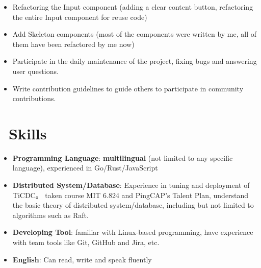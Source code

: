 \documentclass{resume}
\newcommand{\en}[1]{#1}
\newcommand{\zh}[1]{}
\begin{document}
\en{}
\zh{\role{维护者}{\href{https://github.com/ant-design/ant-design/commits?author=hi-rustin}{24+ 个提交}}}
\begin{itemize}
      \item \en{Refactoring the Input component (adding a clear content button, refactoring the entire Input component for reuse code)}
            \zh{重构 Input 组件（添加一个清除内容按钮，为了复用代码重构整个 Input 组件）}
      \item \en{Add Skeleton components (most of the components were written by me, all of them have been refactored by me now)}
            \zh{添加 Skeleton 组件（大部分组件由我编写，目前所有组件已被我重构）}
      \item \en{Participate in the daily maintenance of the project, fixing bugs and answering user questions.}
            \zh{参与项目日常维护，修复 bug 和回答用户问题。}
      \item \en{Write contribution guidelines to guide others to participate in community contributions.}
            \zh{编写贡献指南，引导其他人参与社区贡献。}
\end{itemize}

\section{\faCogs\ \en{Skills}\zh{技能}}
\begin{itemize}[parsep=0.25ex]
      \item \en{\textbf{Programming Language}:
                  \textbf{multilingual} (not limited to any specific language),
                  experienced in Go/Rust/JavaScript}
            \zh{\textbf{编程语言}:
                  \textbf{泛语言}（编程不受特定语言限制），
                  熟悉 Go/Rust/JavaScript}

      \item \en{\textbf{Distributed System/Database}:
                  Experience in tuning and deployment of TiCDC。
                  taken course MIT 6.824 and PingCAP's Talent Plan,
                  understand the basic theory of distributed system/database,
                  including but not limited to algorithms such as Raft.}
            \zh{\textbf{分布式系统/数据库}:
                  有分布式系统 TiCDC 的调优开发以及部署经验。
                  自主学习了 MIT 6.824 和 PingCAP's Talent Plan 等课程，
                  了解分布式系统/数据库的基本理论，包括但不限于 Raft 等算法}

      \item \en{\textbf{Developing Tool}:
                  familiar with Linux-based programming,
                  have experience with team tools like Git, GitHub and Jira, etc.}
            \zh{\textbf{开发工具}:
                  熟悉 Linux，有 Git、GitHub 和 Jira 等团队协作工具的使用经验}

      \item \en{\textbf{English}:
                  Can read, write and speak fluently}
            \zh{\textbf{英语}:
                  可以熟练的听说读写}
\end{itemize}
\end{document}

